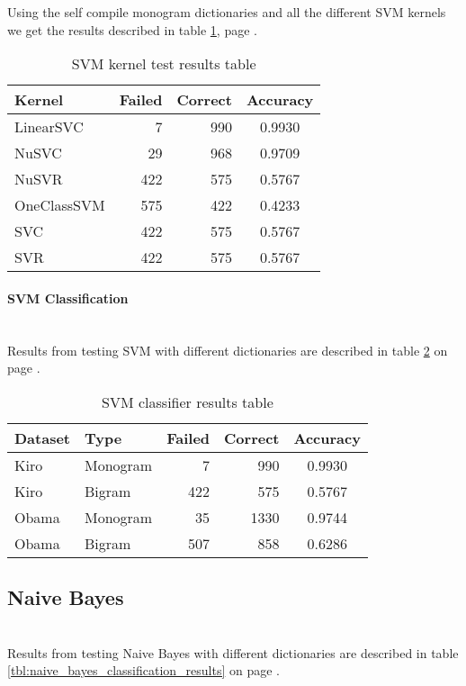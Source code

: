 Using the self compile monogram dictionaries and all the different SVM kernels
we get the results described in table \ref{tbl:svm_classifier_kernel_test}, page
\pageref{tbl:svm_classifier_kernel_test}.

\begin{table}
\centering
\label{tbl:svm_classifier_kernel_test}
\caption{SVM kernel test results table}
\begin{tabular}{ l r r c }
Kernel & Failed & Correct & Accuracy \\
\hline
LinearSVC & 7 & 990 & 0.9930 \\
NuSVC & 29 & 968 & 0.9709 \\
NuSVR & 422 & 575 & 0.5767 \\
OneClassSVM & 575 & 422 & 0.4233 \\
SVC & 422 & 575 & 0.5767 \\
SVR & 422 & 575 & 0.5767 \\
\end{tabular}
\end{table}

\paragraph{SVM Classification}
\hspace{0pt}\\
Results from testing SVM with different dictionaries are described in table
\ref{tbl:svm_classifier_results} on page
\pageref{tbl:svm_classifier_results}.

\begin{table}
\centering
\label{tbl:svm_classifier_results}
\caption{SVM classifier results table}
\begin{tabular}{ l l r r c }
Dataset & Type & Failed & Correct & Accuracy \\
\hline
Kiro & Monogram & 7 & 990 & 0.9930 \\
Kiro & Bigram & 422 & 575 & 0.5767 \\
Obama & Monogram & 35 & 1330 & 0.9744 \\
Obama & Bigram & 507 & 858 & 0.6286 \\
\end{tabular}
\end{table}

\subsection{Naive Bayes}\label{experiments:naive_bayes_classification}
\hspace{0pt}\\
Results from testing Naive Bayes with different dictionaries are described in
table \ref{tbl:naive_bayes_classification_results} on page
\pageref{tbl:naive_bayes_classification_results}.

